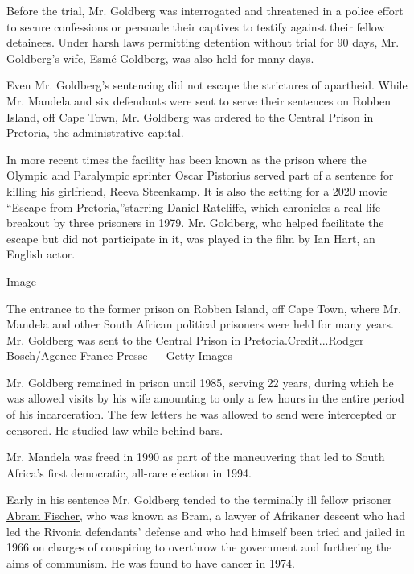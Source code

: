 Before the trial, Mr. Goldberg was interrogated and threatened in a
police effort to secure confessions or persuade their captives to
testify against their fellow detainees. Under harsh laws permitting
detention without trial for 90 days, Mr. Goldberg's wife, Esmé Goldberg,
was also held for many days.

Even Mr. Goldberg's sentencing did not escape the strictures of
apartheid. While Mr. Mandela and six defendants were sent to serve their
sentences on Robben Island, off Cape Town, Mr. Goldberg was ordered to
the Central Prison in Pretoria, the administrative capital.

In more recent times the facility has been known as the prison where the
Olympic and Paralympic sprinter Oscar Pistorius served part of a
sentence for killing his girlfriend, Reeva Steenkamp. It is also the
setting for a 2020 movie
\href{https://variety.com/2020/film/reviews/escape-from-pretoria-film-review-daniel-radcliffe-1203525520/}{``Escape
from Pretoria,''}starring Daniel Ratcliffe, which chronicles a real-life
breakout by three prisoners in 1979. Mr. Goldberg, who helped facilitate
the escape but did not participate in it, was played in the film by Ian
Hart, an English actor.

Image

The entrance to the former prison on Robben Island, off Cape Town, where
Mr. Mandela and other South African political prisoners were held for
many years. Mr. Goldberg was sent to the Central Prison in
Pretoria.Credit...Rodger Bosch/Agence France-Presse --- Getty Images

Mr. Goldberg remained in prison until 1985, serving 22 years, during
which he was allowed visits by his wife amounting to only a few hours in
the entire period of his incarceration. The few letters he was allowed
to send were intercepted or censored. He studied law while behind bars.

Mr. Mandela was freed in 1990 as part of the maneuvering that led to
South Africa's first democratic, all-race election in 1994.

Early in his sentence Mr. Goldberg tended to the terminally ill fellow
prisoner
\href{https://www.sahistory.org.za/people/abram-bram-fischer}{Abram
Fischer}, who was known as Bram, a lawyer of Afrikaner descent who had
led the Rivonia defendants' defense and who had himself been tried and
jailed in 1966 on charges of conspiring to overthrow the government and
furthering the aims of communism. He was found to have cancer in 1974.

